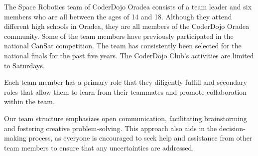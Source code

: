 \documentclass[11pt]{article}
\begin{document}
The Space Robotics team of CoderDojo Oradea consists of a team leader and six members who are all between the ages of 14 and 18. Although they attend different high schools in Oradea, they are all members of the CoderDojo Oradea community. Some of the team members have previously participated in the national CanSat competition. The team has consistently been selected for the national finals for the past five years. The CoderDojo Club's activities are limited to Saturdays.

Each team member has a primary role that they diligently fulfill and secondary roles that allow them to learn from their teammates and promote collaboration within the team.

Our team structure emphasizes open communication, facilitating brainstorming and fostering creative problem-solving. This approach also aids in the decision-making process, as everyone is encouraged to seek help and assistance from other team members to ensure that any uncertainties are addressed.
\end{document}
